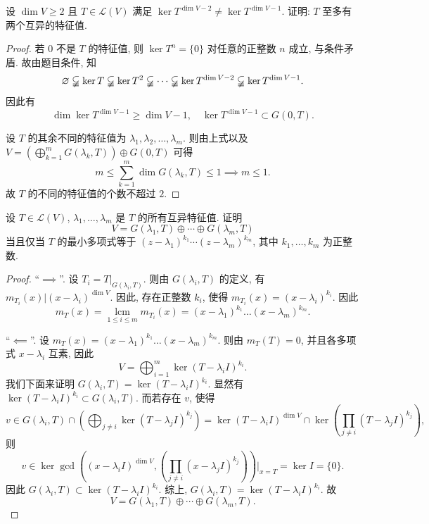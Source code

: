 \documentclass{article}
\begin{document}
\begin{problem}[8B-4]
设 $\dim V \ge 2$ 且 $T \in \mathcal{L}(V)$ 满足 $\ker T^{\dim V - 2} \ne \ker T^{\dim V - 1}$. 证明: $T$ 至多有两个互异的特征值.
\end{problem}

\begin{proof}
  若 \( 0 \) 不是 \( T \) 的特征值, 则 \( \ker T^n = \{0\} \) 对任意的正整数 \( n \) 成立, 与条件矛盾. 故由题目条件, 知
  \[ \varnothing \varsubsetneqq \ker T \varsubsetneqq \ker T^2 \varsubsetneqq \cdots \varsubsetneqq \ker T^{\dim V - 2} \varsubsetneqq \ker T^{\dim V-1}. \]
  因此有
  \[ \dim\ker T^{\dim V-1}\ge \dim V-1,\quad \ker T^{\dim V-1}\subset G(0,T). \]

  设 \( T \) 的其余不同的特征值为 \( \lambda_1,\lambda_2,\dots,\lambda_m \). 则由上式以及 \( V=\left( \bigoplus_{k=1}^{m}G(\lambda_k,T) \right)\oplus G(0,T) \) 可得
  \[ m \le \sum_{k=1}^{m} \dim G(\lambda_k,T) \le 1
  \implies m \le 1. \]
  故 \( T \) 的不同的特征值的个数不超过 \( 2 \).
\end{proof}



\begin{problem}[8B-8]
设 $T \in \mathcal{L}(V)$, $\lambda_1, \ldots, \lambda_m$ 是 $T$ 的所有互异特征值. 证明
\[
V = G(\lambda_1, T) \oplus \cdots \oplus G(\lambda_m, T)
\]
当且仅当 $T$ 的最小多项式等于 $(z-\lambda_1)^{k_1} \cdots (z-\lambda_m)^{k_m}$, 其中 $k_1, \ldots, k_m$ 为正整数.
\end{problem}

\begin{proof}
  ``\( \implies \)''. 设 \( T_i=T|_{G(\lambda_i,T)} \). 则由 \( G(\lambda_i,T) \) 的定义, 有 \( m_{T_i}(x) \big| (x-\lambda_i)^{\dim V} \). 因此, 存在正整数 \( k_i \), 使得 \( m_{T_i}(x) = (x-\lambda_i)^{k_i} \). 因此
  \[ m_T(x) = \operatorname{lcm}\limits_{1\le i\le m}m_{T_i}(x) 
  = (x-\lambda_1)^{k_1}\dots(x-\lambda_m)^{k_m}. \]

  ``\( \impliedby \)''. 设 \( m_T(x) = (x-\lambda_1)^{k_1}\dots(x-\lambda_m)^{k_m} \). 则由 \( m_T(T)=0 \), 并且各多项式 \( x-\lambda_i \) 互素, 因此
  \[ V=\bigoplus_{i=1}^{m} \ker (T-\lambda_i I)^{k_i}. \]
  我们下面来证明 \( G(\lambda_i,T)=\ker (T-\lambda_i I)^{k_i} \). 显然有 \( \ker (T-\lambda_i I)^{k_i} \subset G(\lambda_i,T) \). 而若存在 \( v \), 使得
  \[ v
  \in G(\lambda_i,T) \cap \left( \bigoplus_{j\neq i} \ker (T-\lambda_j I)^{k_j} \right) 
  = \ker (T-\lambda_i I)^{\dim V} \cap \ker \left( \prod_{j\neq i}^{} (T-\lambda_j I)^{k_j} \right), \]
  则
  \[ v\in\ker \gcd \left( (x-\lambda_i I)^{\dim V} , \left( \prod_{j\neq i}^{} (x-\lambda_j I)^{k_j} \right) \right) \Big|_{x=T}
  =\ker I = \{0\}. \]
  因此 \( G(\lambda_i,T) \subset \ker (T-\lambda_i I)^{k_i} \). 综上, \( G(\lambda_i,T)=\ker (T-\lambda_i I)^{k_i} \). 故
  \[ V = G(\lambda_1, T) \oplus \cdots \oplus G(\lambda_m, T). \]
\end{proof}
\end{document}
